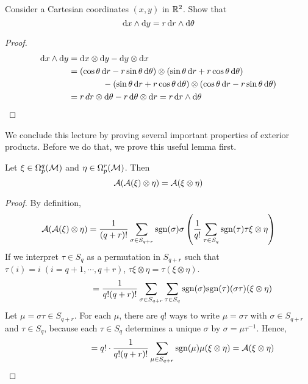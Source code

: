 \documentclass[a4paper, 10pt]{article}
\begin{document}

\begin{exer}
    Consider a Cartesian coordinates $(x,y)$ in $\mathbb{R}^{2}$. Show that
    \[ \mathrm{d}{x} \wedge \mathrm{d}{y} = r\,\mathrm{d}{r} \wedge \mathrm{d}{\theta} \]
\end{exer}

\begin{proof}
    \begin{align*}
        \mathrm{d}{x} \wedge \mathrm{d}{y} &= \mathrm{d}{x} \otimes \mathrm{d}{y} - \mathrm{d}{y} \otimes \mathrm{d}{x} \\
        &= (\cos\theta\,\mathrm{d}{r} - r\sin\theta\,\mathrm{d}{\theta}) \otimes (\sin\theta\,\mathrm{d}{r} + r\cos\theta\,\mathrm{d}{\theta}) \\
        & \qquad\qquad - (\sin\theta\,\mathrm{d}{r} + r\cos\theta\,\mathrm{d}{\theta}) \otimes (\cos\theta\,\mathrm{d}{r} - r\sin\theta\,\mathrm{d}{\theta}) \\
        &= r\,d{r} \otimes \mathrm{d}\theta - r\,\mathrm{d}\theta \otimes \mathrm{d}{r} = r\,\mathrm{d}{r}\wedge\mathrm{d}\theta
    \end{align*}
\end{proof}

We conclude this lecture by proving several important properties of exterior products. Before we do that, we prove this useful lemma first.

\begin{lemma}
    Let $\xi \in \Omega_{p}^{q}(\mathcal{M})$ and $\eta \in \Omega_{p}^{r}(\mathcal{M})$. Then
    \[ \mathcal{A}(\mathcal{A}(\xi) \otimes \eta) = \mathcal{A}(\xi \otimes \eta) \]
\end{lemma}

\begin{proof}
    By definition,
    \[ \mathcal{A}(\mathcal{A}(\xi) \otimes \eta) = \frac{1}{(q+r)!}\sum_{\sigma\in S_{q+r}}\mathrm{sgn}(\sigma)\sigma\left(\frac{1}{q!}\sum_{\tau \in S_{q}} \mathrm{sgn}( \tau)\tau\xi \otimes \eta\right) \]
    If we interpret $\tau \in S_{q}$ as a permutation in $S_{q+r}$ such that $\tau(i) = i \;(i = q+1, \cdots, q+r)$, $\tau\xi \otimes \eta = \tau(\xi\otimes\eta)$.
    \[ \phantom{\mca{A}(\mca{A}(\xi) \otimes \eta)} = \frac{1}{q!(q+r)!}\sum_{\sigma \in S_{q+r}}\sum_{\tau \in S_{q}}\mrm{sgn}(\sigma)\mrm{sgn}(\tau)(\sigma\tau)(\xi\otimes\eta) \]
    Let $\mu = \sigma\tau \in S_{q+r}$. For each $\mu$, there are $q!$ ways to write $\mu = \sigma\tau$ with $\sigma \in S_{q+r}$ and $\tau \in S_{q}$, because each $\tau \in S_{q}$ determines a unique $\sigma$ by $\sigma = \mu\tau^{-1}$. Hence,
    \[ \phantom{\mca{A}(\mca{A}(\xi) \otimes \eta)} = q! \cdot \frac{1}{q!(q+r)!}\sum_{\mu \in S_{q+r}}\mrm{sgn}(\mu)\mu(\xi\otimes\eta) = \mca{A}(\xi\otimes\eta) \]
\end{proof}
\newpage
\end{document}
